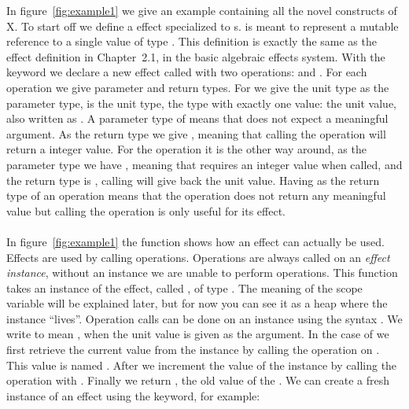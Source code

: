 In figure~\ref{fig:example1} we give an example containing all the novel constructs of X.
To start off we define a  effect specialized to s.
 is meant to represent a mutable reference to a single value of type .
This definition is exactly the same as the  effect definition in Chapter~2.1, in the basic algebraic effects system.
With the  keyword we declare a new effect called  with two operations:  and .
For each operation we give parameter and return types. For  we give the unit type \ident{()} as the parameter type, \ident{()} is the unit type, the type with exactly one value: the unit value, also written as \ident{()}. A parameter type of \ident{()} means that  does not expect a meaningful argument. As the return type we give , meaning that calling the  operation will return a integer value. For the  operation it is the other way around, as the parameter type we have , meaning that  requires an integer value when called, and the return type is \ident{()}, calling  will give back the unit value. Having \ident{()} as the return type of an operation means that the operation does not return any meaningful value but calling the operation is only useful for its effect.
\\\\
In figure~\ref{fig:example1} the function  shows how an effect can actually be used.
Effects are used by calling operations.
Operations are always called on an \emph{effect instance}, without an instance we are unable to perform operations.
This function takes an instance of the  effect, called , of type .
The meaning of the scope variable  will be explained later, but for now you can see it as a heap where the instance ``lives''.
Operation calls can be done on an instance using the syntax .
We write  to mean , when the unit value \ident{()} is given as the argument.
In the case of  we first retrieve the current value from the instance by calling the  operation on .
This value is named .
After we increment the value of the instance by calling the  operation with .
Finally we return , the old value of the .
\newpage
We can create a fresh instance of an effect using the  keyword, for example:
